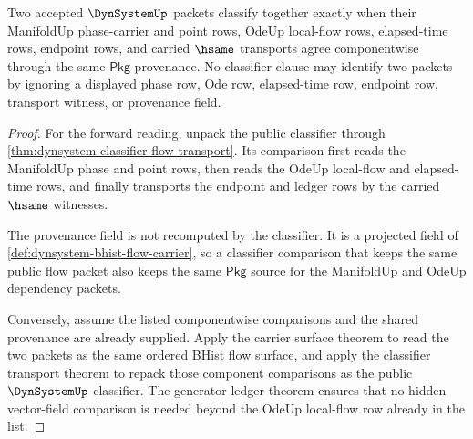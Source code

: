 \begin{theorem}
\label{thm:dynsystem-phase-ode-classifier-exactness}
Two accepted $\DynSystemUp$ packets classify together exactly when their
ManifoldUp phase-carrier and point rows, OdeUp local-flow rows, elapsed-time
rows, endpoint rows, and carried $\hsame$ transports agree componentwise
through the same $\mathsf{Pkg}$ provenance. No classifier clause may identify
two packets by ignoring a displayed phase row, Ode row, elapsed-time row,
endpoint row, transport witness, or provenance field.
\end{theorem}
\begin{proof}
For the forward reading, unpack the public classifier through
\autoref{thm:dynsystem-classifier-flow-transport}. Its comparison first reads
the ManifoldUp phase and point rows, then reads the OdeUp local-flow and
elapsed-time rows, and finally transports the endpoint and ledger rows by the
carried $\hsame$ witnesses.

The provenance field is not recomputed by the classifier. It is a projected
field of \autoref{def:dynsystem-bhist-flow-carrier}, so a classifier comparison
that keeps the same public flow packet also keeps the same $\mathsf{Pkg}$
source for the ManifoldUp and OdeUp dependency packets.

Conversely, assume the listed componentwise comparisons and the shared
provenance are already supplied. Apply the carrier surface theorem to read the
two packets as the same ordered BHist flow surface, and apply the classifier
transport theorem to repack those component comparisons as the public
$\DynSystemUp$ classifier. The generator ledger theorem ensures that no hidden
vector-field comparison is needed beyond the OdeUp local-flow row already in
the list.
\end{proof}

